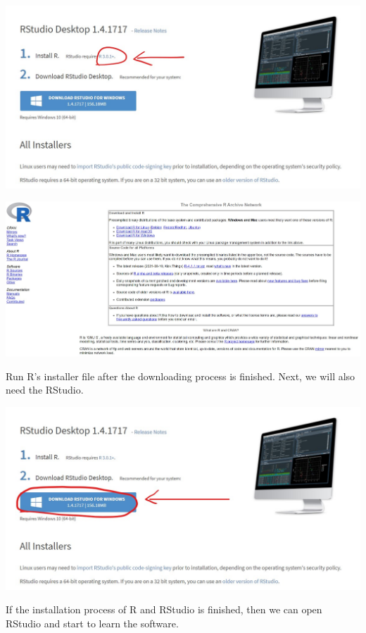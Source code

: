 \documentclass[
]{article}
\begin{document}
\href{https://www.rstudio.com/products/rstudio/download/\#download}{\includegraphics[width=6.25in,height=\textheight]{images/installr.jpg}}

\href{https://cran.rstudio.com/}{\includegraphics[width=6.25in,height=\textheight]{images/installr2.jpg}}

Run R's installer file after the downloading process is finished.
Next, we will also need the RStudio.

\href{https://www.rstudio.com/products/rstudio/download/\#download}{\includegraphics[width=6.25in,height=\textheight]{images/installr3.jpg}}

If the installation process of R and RStudio is finished, then we can open RStudio and start to learn the software.
\end{document}
